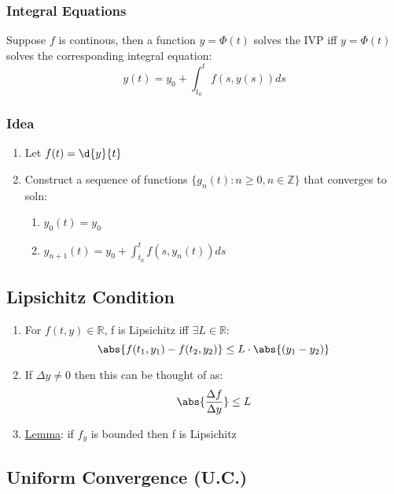 \documentclass[11pt]{article}
\begin{document}
\subsubsection{Integral Equations}
\label{sec-9.4.1}

    Suppose $f$ is continous, then a function $y=\Phi(t)$
    solves the IVP iff $y=\Phi(t)$ solves the corresponding integral equation:
    \begin{equation}
    y(t)=y_0+\int_{t_0}^t f(s,y(s))ds
    \end{equation}
\subsubsection{Idea}
\label{sec-9.4.2}

\begin{enumerate}
\item Let $f(t) = \d{y}{t}$
\item Construct a sequence of functions $\{g_n(t) : n \geq 0, n\in \mathbb{Z}\}$ that converges to soln:

\begin{enumerate}
\item $y_0(t) = y_0$
\item $y_{n+1}(t)=y_0+ \int_{t_0}^tf(s,y_n(t))ds$
\end{enumerate}

\end{enumerate}
\subsection{Lipsichitz Condition}
\label{sec-9.5}

\begin{enumerate}
\item For $f(t,y) \in \mathbb{R}$, f is Lipsichitz iff $\exists L\in \mathbb{R}$:
      \begin{equation}
      \abs{f(t_1,y_1)-f(t_2,y_2)} \leq L\cdot \abs{(y_1-y_2)}
      \end{equation}
\item If $\Delta y \neq 0$ then this can be thought of as:
      \begin{equation}
      \abs{\frac{\Delta f}{\Delta y}} \leq L
      \end{equation}
\item \underline{Lemma}: if $f_y$ is bounded then f is Lipsichitz
\end{enumerate}
\subsection{Uniform Convergence (U.C.)}
\label{sec-9.6}
\end{document}
